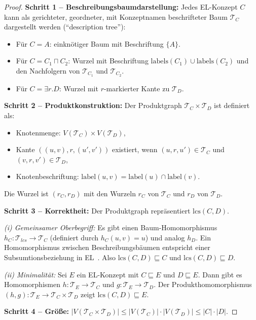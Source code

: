 ﻿\documentclass[a4paper,12pt]{article}
\theoremstyle{definition}
\theoremstyle{plain}
\theoremstyle{remark}
\begin{document}
\begin{proof}
\textbf{Schritt 1 -- Beschreibungsbaumdarstellung:}
Jedes \textsf{EL}-Konzept $C$ kann als gerichteter,
geordneter, mit Konzeptnamen beschrifteter Baum $\mathcal{T}_C$
dargestellt werden (``description tree''):
\begin{itemize}
  \item F{\"{u}}r $C = A$: einkn{\"{o}}tiger Baum mit Beschriftung $\{A\}$.
  \item F{\"{u}}r $C = C_1 \sqcap C_2$:
        Wurzel mit Beschriftung $\mathrm{labels}(C_1) \cup \mathrm{labels}(C_2)$
        und den Nachfolgern von $\mathcal{T}_{C_1}$ und $\mathcal{T}_{C_2}$.
  \item F{\"{u}}r $C = \exists r.D$:
        Wurzel mit $r$-markierter Kante zu $\mathcal{T}_D$.
\end{itemize}

\textbf{Schritt 2 -- Produktkonstruktion:}
Der Produktgraph $\mathcal{T}_C \times \mathcal{T}_D$
ist definiert als:
\begin{itemize}
  \item Knotenmenge: $V(\mathcal{T}_C) \times V(\mathcal{T}_D)$,
  \item Kante $((u,v), r, (u',v'))$ existiert, wenn
        $(u,r,u') \in \mathcal{T}_C$ und $(v,r,v') \in \mathcal{T}_D$,
  \item Knotenbeschriftung:
        $\mathrm{label}(u,v) = \mathrm{label}(u) \cap \mathrm{label}(v)$.
\end{itemize}
Die Wurzel ist $(r_C, r_D)$ mit den Wurzeln $r_C$ von $\mathcal{T}_C$
und $r_D$ von $\mathcal{T}_D$.

\textbf{Schritt 3 -- Korrektheit:}
Der Produktgraph repr{\"{a}}sentiert $\mathrm{lcs}(C,D)$.

\textit{(i) Gemeinsamer Oberbegriff:}
Es gibt einen Baum-Homomorphismus $h_C: \mathcal{T}_{lcs} \to \mathcal{T}_C$
(definiert durch $h_C(u,v) = u$) und analog $h_D$.
Ein Homomorphismus zwischen Beschreibungsb{\"{a}}umen entspricht
einer Subsumtionsbeziehung in \textsf{EL}~\cite{Baader2007}.
Also $\mathrm{lcs}(C,D) \sqsubseteq C$ und $\mathrm{lcs}(C,D) \sqsubseteq D$.

\textit{(ii) Minimalit{\"{a}}t:}
Sei $E$ ein \textsf{EL}-Konzept mit $C \sqsubseteq E$ und $D \sqsubseteq E$.
Dann gibt es Homomorphismen $h: \mathcal{T}_E \to \mathcal{T}_C$
und $g: \mathcal{T}_E \to \mathcal{T}_D$.
Der Produkthomomorphismus $(h,g): \mathcal{T}_E \to \mathcal{T}_C \times \mathcal{T}_D$
zeigt $\mathrm{lcs}(C,D) \sqsubseteq E$.

\textbf{Schritt 4 -- Gr{\"{o}}{\ss}e:}
$|V(\mathcal{T}_C \times \mathcal{T}_D)|
\leq |V(\mathcal{T}_C)| \cdot |V(\mathcal{T}_D)|
\leq |C| \cdot |D|$.
\qedhere
\end{proof}
\end{document}
